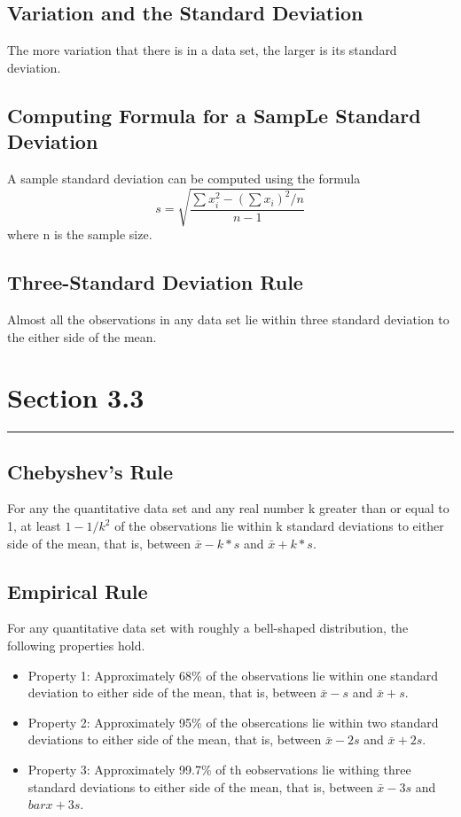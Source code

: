 \documentclass[12pt]{article}
\begin{document}
        \subsection*{Variation and the Standard Deviation}
                The more variation that there is in a data set, the larger is its standard deviation.
        \subsection*{Computing Formula for a SampLe Standard Deviation}
            A sample standard deviation can be computed using the formula
            \begin{equation}
                s = \sqrt{\frac{\sum{x_i^2}-(\sum{x_i})^2/n}{n-1}}                     
            \end{equation}
            where n is the sample size.
        \subsection*{Three-Standard Deviation Rule}
            Almost all the observations in any data set lie within three standard deviation to the either side of the mean.
    \section*{Section 3.3}
    \noindent\rule{\textwidth}{0.4pt}
        \subsection*{Chebyshev's Rule}
            For any the quantitative data set and any real number k greater than or equal to 1, at least \(1-1/k^2\) of the
            observations lie within k standard deviations to either side of the mean, that is, between \(\bar{x}-k*s\) and \(\bar{x}+k*s\).
        \subsection*{Empirical Rule}
        For any quantitative data set with roughly a bell-shaped distribution, the following properties hold.
        \begin{itemize}
            \item{Property 1:} Approximately 68\% of the observations lie within one standard deviation to either side of the mean, that is,
            between \(\bar{x}-s\) and \(\bar{x}+s\).
            \item{Property 2:} Approximately 95\% of the obsercations lie within two standard deviations to either side of the mean, that is,
            between \(\bar{x}-2s\) and \(\bar{x}+2s\).
            \item{Property 3:} Approximately 99.7\% of th eobservations lie withing three standard deviations to either side of the mean,
            that is, between \(\bar{x}-3s\) and \(bar{x}+3s\).
        \end{itemize}
\end{document}
